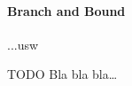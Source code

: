 \paragraph{Branch and Bound}
\label{par:methods.flat.wrapper.branch_and_bound}


...usw
  
  
TODO
Bla bla bla\ldots